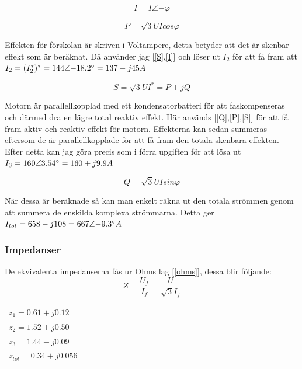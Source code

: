 \documentclass{article}
\begin{document}
  \begin{equation}
    \underline{I} = I\angle{-\varphi}
    \label{I}
  \end{equation}

  \begin{equation}
    P=\sqrt3UIcos\varphi
    \label{P}
  \end{equation}

  Effekten för förskolan är skriven i Voltampere, detta betyder att det är skenbar effekt som är beräknat.
  Då använder jag [\ref{S},\ref{I}] och löser ut $I_2$ för att få fram att $I_2=(I_2^*)^*=144\angle{-18.2\degree}=137-j45 A$

  \begin{equation}
    S=\sqrt3UI^*=P+jQ
    \label{S}
  \end{equation}

  Motorn är parallellkopplad med ett kondensatorbatteri för att faskompenseras och därmed dra en lägre total reaktiv effekt.
  Här används [\ref{Q},\ref{P},\ref{S}] för att få fram aktiv och reaktiv effekt för motorn.
  Effekterna kan sedan summeras eftersom de är parallellkopplade för att få fram den totala skenbara effekten.
  Efter detta kan jag göra precis som i förra upgiften för att lösa ut $I_3=160\angle{3.54\degree}=160+j9.9 A$

  \begin{equation}
    Q=\sqrt3UIsin\varphi
    \label{Q}
  \end{equation}

  När dessa är beräknade så kan man enkelt räkna ut den totala strömmen genom att summera de enskilda komplexa strömmarna.
  Detta ger $I_{tot}=658-j108 = 667\angle{-9.3\degree} A$

  \subsubsection{Impedanser}
  De ekvivalenta impedanserna fås ur Ohms lag [\ref{ohms}], dessa blir följande:
  \begin{equation}
    Z=\frac{U_f}{I_f}=\frac{U}{\sqrt{3} I_f}
    \label{ohms}
  \end{equation}

  \begin{tabular}{l}
    $z_1=0.61 + j0.12$\\
    $z_2=1.52 + j0.50$\\
    $z_3=1.44 - j0.09$\\
    $z_{tot}=0.34 + j0.056$\\
  \end{tabular}
\end{document}
